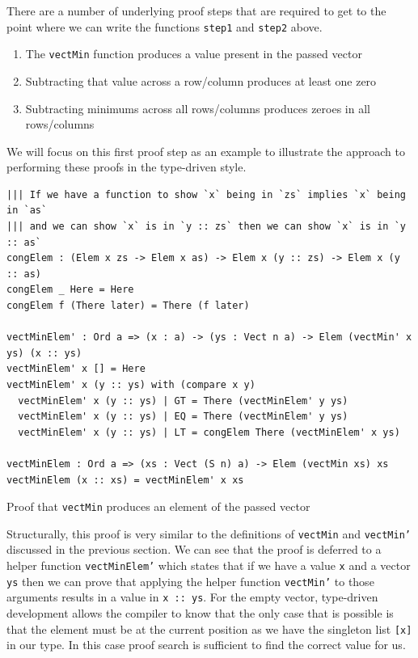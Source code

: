 \documentclass[a4paper, notitlepage]{report}
\begin{document}
There are a number of underlying proof steps that are required to get to the
point where we can write the functions \texttt{step1} and \texttt{step2} above.
\begin{enumerate}
\item The \texttt{vectMin} function produces a value present in the passed vector
\item Subtracting that value across a row/column produces at least one zero
\item Subtracting minimums across all rows/columns produces zeroes in all
rows/columns
\end{enumerate}

We will focus on this first proof step as an example to illustrate the approach
to performing these proofs in the type-driven style.

\begin{listing}[H]
\begin{verbatim}
||| If we have a function to show `x` being in `zs` implies `x` being in `as`
||| and we can show `x` is in `y :: zs` then we can show `x` is in `y :: as`
congElem : (Elem x zs -> Elem x as) -> Elem x (y :: zs) -> Elem x (y :: as)
congElem _ Here = Here
congElem f (There later) = There (f later)

vectMinElem' : Ord a => (x : a) -> (ys : Vect n a) -> Elem (vectMin' x ys) (x :: ys)
vectMinElem' x [] = Here
vectMinElem' x (y :: ys) with (compare x y)
  vectMinElem' x (y :: ys) | GT = There (vectMinElem' y ys)
  vectMinElem' x (y :: ys) | EQ = There (vectMinElem' y ys)
  vectMinElem' x (y :: ys) | LT = congElem There (vectMinElem' x ys)

vectMinElem : Ord a => (xs : Vect (S n) a) -> Elem (vectMin xs) xs
vectMinElem (x :: xs) = vectMinElem' x xs
\end{verbatim}
\caption{Proof that \texttt{vectMin} produces an element of the passed vector}
\end{listing}

Structurally, this proof is very similar to the definitions of \texttt{vectMin} and
\texttt{vectMin'} discussed in the previous section. We can see that the proof is
deferred to a helper function \texttt{vectMinElem'} which states that if we have a value
\texttt{x} and a vector \texttt{ys} then we can prove that applying the helper function \texttt{vectMin'}
to those arguments results in a value in \texttt{x :: ys}. For the empty vector,
type-driven development allows the compiler to know that the only case that is
possible is that the element must be at the current position as we have the
singleton list \texttt{[x]} in our type. In this case proof search is sufficient to find
the correct value for us.
\end{document}
